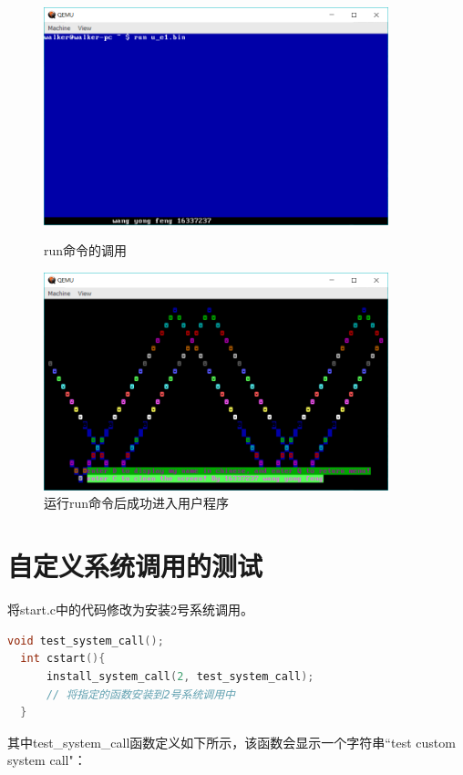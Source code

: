 \documentclass[forprint]{WHUBachelor}
\begin{document}
\begin{figure}[htp]
  \centering
  \begin{minipage}[t]{0.5\linewidth} 
    \centering
  \includegraphics[width=10cm]{"./figure/test_run.png"}
  \caption{run命令的调用}
  \label{fig:test_run}
\end{minipage}

  \begin{minipage}[t]{0.5\linewidth} 
  \centering
  \includegraphics[width=10cm]{"./figure/test_run_u_e1.png"}
  \caption{运行run命令后成功进入用户程序}
  \label{fig:test_run_u_e1}
\end{minipage}
\end{figure}

\section{自定义系统调用的测试}

将start.c中的代码修改为安装2号系统调用。

\begin{lstlisting}[language=c]
  void test_system_call();
  int cstart(){
      install_system_call(2, test_system_call);
      // 将指定的函数安装到2号系统调用中
  }
\end{lstlisting}

其中test\_system\_call函数定义如下所示，该函数会显示一个字符串“test custom system call"：
\end{document}
